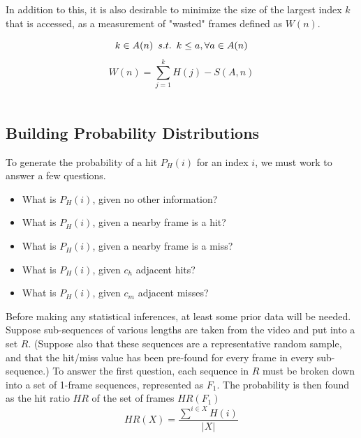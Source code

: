 \documentclass{article}
\def\suchThat{\hspace{0.5em} s.t. \hspace{0.5em}}
\newcommand{\br}{ \hfill \break}
\begin{document}
\begin{adjustwidth}{2.5em}{0pt}
        In addition to this, it is also desirable to minimize the size of the largest index $k$ that is accessed, as a measurement of "wasted" frames defined as $W(n)$.

            $$ k \in A(n) \suchThat k \leq a, \forall a \in A(n) $$
            $$ W(n) = \displaystyle\sum_{j=1}^{k} H(j) - S(A, n) $$ \\
        
    
    \subsection{Building Probability Distributions}
        To generate the probability of a hit $P_H(i)$ for an index $i$, we must work to answer a few questions.
        \begin{itemize}
            \item What is $P_H(i)$, given no other information?
            \item What is $P_H(i)$, given a nearby frame is a hit?
            \item What is $P_H(i)$, given a nearby frame is a miss?
            \item What is $P_H(i)$, given $c_h$ adjacent hits?
            \item What is $P_H(i)$, given $c_m$ adjacent misses?
        \end{itemize}
        Before making any statistical inferences, at least some prior data will be needed. Suppose sub-sequences of various lengths are taken from the video and put into a set $R$. (Suppose also that these sequences are a representative random sample, and that the hit/miss value has been pre-found for every frame in every sub-sequence.)
        \br
        \br
        To answer the first question, each sequence in $R$ must be broken down into a set of 1-frame sequences, represented as $F_1$. The probability is then found as the hit ratio $\mathit{HR}$ of the set of frames $HR(F_1)$
            $$ \mathit{HR}(X) =  \frac{ \displaystyle\sum^{i \in X} H(i) }{ |X| }  $$
        

\end{adjustwidth}
\end{document}
